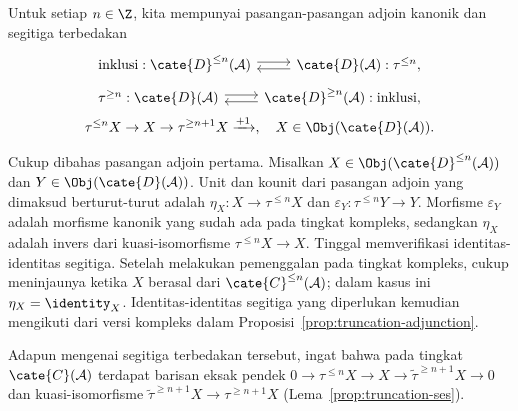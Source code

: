 \begin{proposisi}\label{prop:derived-truncation-adjunction}
	Untuk setiap $n \in \Z$, kita mempunyai pasangan-pasangan adjoin kanonik
	dan segitiga terbedakan
	\begin{equation*}\begin{gathered}\begin{tikzcd}
		\text{inklusi}: \cate{D}^{\leq n}(\mathcal{A}) \arrow[shift left, r] & \cate{D}(\mathcal{A}) :\tau^{\leq n} \arrow[shift left, l] ,
	\end{tikzcd} \\
	\begin{tikzcd}
		\tau^{\geq n}: \cate{D}(\mathcal{A}) \arrow[shift left, r] & \cate{D}^{\geq n}(\mathcal{A}) :\text{inklusi} \arrow[shift left, l] ,
	\end{tikzcd} \\
		\tau^{\leq n} X \to X \to \tau^{\geq n+1} X \xrightarrow{+1}, \quad X \in \Obj(\cate{D}(\mathcal{A})).
	\end{gathered}\end{equation*}
\end{proposisi}

\begin{bukti}
	Cukup dibahas pasangan adjoin pertama. Misalkan
	$X \in \Obj(\cate{D}^{\leq n}(\mathcal{A}))$ dan
	$Y \in \Obj(\cate{D}(\mathcal{A}))$. Unit dan kounit dari pasangan adjoin
	yang dimaksud berturut-turut adalah
	$\eta_X: X \to \tau^{\leq n} X$ dan
	$\varepsilon_Y: \tau^{\leq n} Y \to Y$. Morfisme $\varepsilon_Y$ adalah
	morfisme kanonik yang sudah ada pada tingkat kompleks, sedangkan $\eta_X$
	adalah invers dari kuasi-isomorfisme $\tau^{\leq n} X \to X$. Tinggal
	memverifikasi identitas-identitas segitiga. Setelah melakukan pemenggalan
	pada tingkat kompleks, cukup meninjaunya ketika $X$ berasal dari
	$\cate{C}^{\leq n}(\mathcal{A})$; dalam kasus ini
	$\eta_X = \identity_X$. Identitas-identitas segitiga yang diperlukan
	kemudian mengikuti dari versi kompleks dalam
	Proposisi~\ref{prop:truncation-adjunction}.

	Adapun mengenai segitiga terbedakan tersebut, ingat bahwa pada tingkat
	$\cate{C}(\mathcal{A})$ terdapat barisan eksak pendek
	$0 \to \tau^{\leq n} X \to X \to \tilde{\tau}^{\geq n+1} X \to 0$ dan
	kuasi-isomorfisme
	$\tilde{\tau}^{\geq n+1} X \to \tau^{\geq n+1} X$
	(Lema~\ref{prop:truncation-ses}).
\end{bukti}

